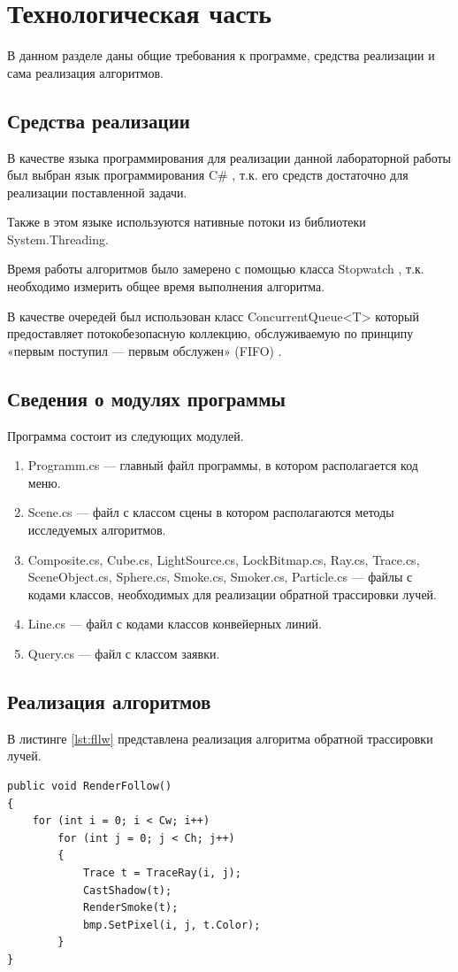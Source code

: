 \chapter{Технологическая часть}

В данном разделе даны общие требования к программе, средства реализации и сама реализация алгоритмов.

\section{Средства реализации}

В качестве языка программирования для реализации данной лабораторной работы был выбран язык программирования C\# \cite{sharplang}, т.к. его средств достаточно для реализации поставленной задачи.

Также в этом языке используются нативные потоки \cite{threads} из библиотеки System.Threading.

Время работы алгоритмов было замерено с помощью класса Stopwatch \cite{cpplangtime}, т.к. необходимо измерить общее время выполнения алгоритма.

В качестве очередей был использован класс ConcurrentQueue<T> который предоставляет потокобезопасную коллекцию, обслуживаемую по принципу «первым поступил --- первым обслужен» (FIFO) \cite{concqueue}.

\section{Сведения о модулях программы}
Программа состоит из следующих модулей.
\begin{enumerate}
	\item Programm.cs --- главный файл программы, в котором располагается код меню.
	\item Scene.cs --- файл с классом  сцены в котором располагаются методы исследуемых алгоритмов.
	\item Composite.cs, Cube.cs, LightSource.cs, LockBitmap.cs, Ray.cs, Trace.cs, SceneObject.cs, Sphere.cs, Smoke.cs, Smoker.cs, Particle.cs  --- файлы с кодами классов, необходимых для реализации обратной трассировки лучей.
	\item Line.cs --- файл с кодами классов конвейерных линий.
	\item Query.cs --- файл с классом заявки.
\end{enumerate}


\section{Реализация алгоритмов}
В листинге \ref{lst:fllw} представлена реализация алгоритма обратной трассировки лучей.
\captionsetup{justification=raggedright, singlelinecheck=false}
\begin{lstlisting}[label=lst:fllw,caption=Последовательный алгоритм обратной трассировки лучей]
public void RenderFollow()
{
	for (int i = 0; i < Cw; i++)
		for (int j = 0; j < Ch; j++)
		{
			Trace t = TraceRay(i, j);
			CastShadow(t);
			RenderSmoke(t);
			bmp.SetPixel(i, j, t.Color);
		}
}
\end{lstlisting}

